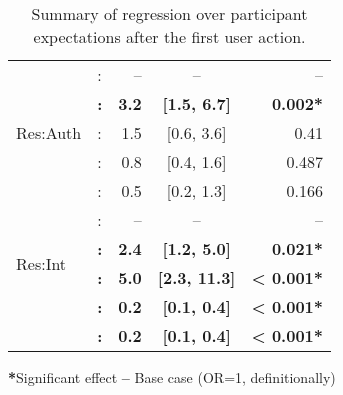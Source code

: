 \begin{table}[t]
\begin{threeparttable}
\begin{tabular}{l l r c r}
     \midrule
     \multirow{5}{*}{Res:Auth} & \mic{}:\never{} & -- & -- & -- \\
     						& \textbf{\contacts{}:\launch{}} & \textbf{3.2} & \textbf{[1.5, 6.7]} & \textbf{0.002*} \\
     							         & \contacts{}:\first{} & 1.5 & [0.6, 3.6] & 0.41 \\
							         & \location{}:\launch{} & 0.8 & [0.4, 1.6] & 0.487 \\
							         & \location{}:\first{} & 0.5 & [0.2, 1.3] & 0.166\\
    \midrule
    \multirow{4}{*}{Res:Int} & \mic{}:\backgroundonly{} & -- & -- & -- \\ 
    							& \textbf{\location{}:\backgroundnotify{}} & \textbf{2.4} & \textbf{[1.2, 5.0]} & \textbf{0.021*} \\
    						        & \textbf{\contacts{}:\backgroundnotify{}} & \textbf{5.0} & \textbf{[2.3, 11.3]} & \textbf{< 0.001*} \\
						        & \textbf{\location{}:\interactive{}} & \textbf{0.2} & \textbf{[0.1, 0.4]} & \textbf{< 0.001*} \\
						        & \textbf{\contacts{}:\interactive{}} & \textbf{0.2} & \textbf{[0.1, 0.4]} & \textbf{< 0.001*} \\
    \bottomrule \bottomrule
\end{tabular}
\begin{tablenotes}
     \small
     \item \textbf{*}Significant effect 
      \hspace*{2cm}
      \textbf{--} Base case (OR=1, definitionally)
   \end{tablenotes}
\end{threeparttable}
\caption{Summary of regression over participant expectations after the first
  user action.}
\label{tab:regression1}
\end{table}


